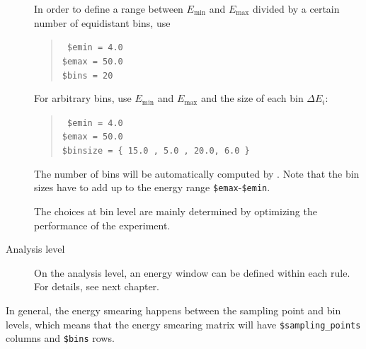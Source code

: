 \begin{description}
In order to define a range between $E_\mathrm{min}$
and $E_\mathrm{max}$ divided by a certain number of equidistant bins,
use
\begin{quote}
{\tt
\$emin = 4.0\\
\$emax = 50.0\\
\$bins = 20
}
\end{quote}
For arbitrary bins, use $E_\mathrm{min}$
and $E_\mathrm{max}$ and the size of each bin  $\Delta E_i$:
\begin{quote}
{\tt
\$emin = 4.0\\
\$emax = 50.0\\
\$binsize = \{  15.0 , 5.0 , 20.0, 6.0 \} 
}
\end{quote}
The number of bins will be automatically computed by \GLOBES . Note that the
bin sizes have to add up to the energy range {\tt \$emax}-{\tt \$emin}.

The choices at bin level are mainly determined by optimizing the
performance of the experiment.

\item[Analysis level]
On the analysis level, an energy window can be defined within each rule. For
details, see next chapter.
\end{description}

In general, the energy smearing happens between the sampling point and bin levels, which means that the energy smearing matrix will have {\tt \$sampling\_points} columns and {\tt \$bins} rows. 

